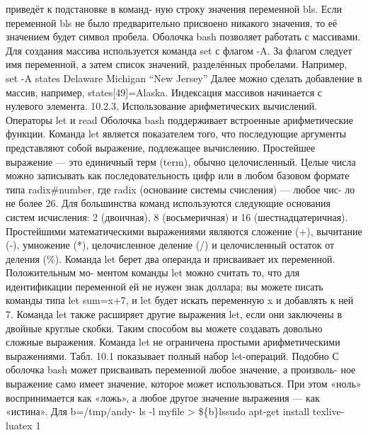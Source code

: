 \documentclass[
  letterpaper,
  DIV=11,
  numbers=noendperiod]{scrartcl}
\begin{document}
приведёт к подстановке в команд- ную строку значения переменной bls.
Если переменной bls не было предварительно присвоено никакого значения,
то её значением будет символ пробела. Оболочка bash позволяет работать с
массивами. Для создания массива используется команда set с флагом -A. За
флагом следует имя переменной, а затем список значений, разделённых
пробелами. Например, set -A states Delaware Michigan ``New Jersey''
Далее можно сделать добавление в массив, например,
states{[}49{]}=Alaska. Индексация массивов начинается с нулевого
элемента. 10.2.3. Использование арифметических вычислений. Операторы let
и read Оболочка bash поддерживает встроенные арифметические функции.
Команда let является показателем того, что последующие аргументы
представляют собой выражение, подлежащее вычислению. Простейшее
выражение --- это единичный терм (term), обычно целочисленный. Целые
числа можно записывать как последовательность цифр или в любом базовом
формате типа radix\#number, где radix (основание системы счисления) ---
любое чис- ло не более 26. Для большинства команд используются следующие
основания систем исчисления: 2 (двоичная), 8 (восьмеричная) и 16
(шестнадцатеричная). Простейшими математическими выражениями являются
сложение (+), вычитание (-), умножение (*), целочисленное деление (/) и
целочисленный остаток от деления (\%). Команда let берет два операнда и
присваивает их переменной. Положительным мо- ментом команды let можно
считать то, что для идентификации переменной ей не нужен знак доллара;
вы можете писать команды типа let sum=x+7, и let будет искать переменную
x и добавлять к ней 7. Команда let также расширяет другие выражения let,
если они заключены в двойные круглые скобки. Таким способом вы можете
создавать довольно сложные выражения. Команда let не ограничена простыми
арифметическими выражениями. Табл. 10.1 показывает полный набор
let-операций. Подобно С оболочка bash может присваивать переменной любое
значение, а произволь- ное выражение само имеет значение, которое может
использоваться. При этом «ноль» воспринимается как «ложь», а любое
другое значение выражения --- как «истина». Для b=/tmp/andy- ls -l
myfile \textgreater{} \$\{b\}lssudo apt-get install texlive-luatex 1
\end{document}

